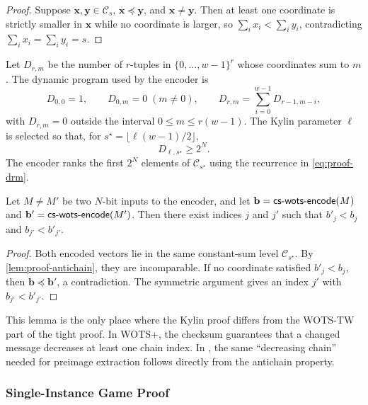 \begin{proof}
Suppose $\mathbf{x},\mathbf{y}\in\mathcal{C}_s$, $\mathbf{x}\preceq
\mathbf{y}$, and $\mathbf{x}\ne\mathbf{y}$.  Then at least one coordinate is
strictly smaller in $\mathbf{x}$ while no coordinate is larger, so
$\sum_i x_i<\sum_i y_i$, contradicting
$\sum_i x_i=\sum_i y_i=s$.
\end{proof}

Let $D_{r,m}$ be the number of $r$-tuples in $\{0,\ldots,w-1\}^r$ whose
coordinates sum to $m$.  The dynamic program used by the encoder is
\begin{equation}
\label{eq:proof-drm}
    D_{0,0}=1,\qquad
    D_{0,m}=0\;(m\ne0),\qquad
    D_{r,m}=\sum_{i=0}^{w-1}D_{r-1,m-i},
\end{equation}
with $D_{r,m}=0$ outside the interval $0\le m\le r(w-1)$.  The Kylin parameter
$\ell$ is selected so that, for
$s^\star=\lfloor\ell(w-1)/2\rfloor$,
\begin{equation}
\label{eq:proof-len-condition}
    D_{\ell,s^\star}\ge 2^N.
\end{equation}
The encoder ranks the first $2^N$ elements of $\mathcal{C}_{s^\star}$ using
the recurrence in \cref{eq:proof-drm}.

\begin{lemma}
\label{lem:proof-cswots-direction}
Let $M\ne M'$ be two $N$-bit inputs to the \WOTSCS encoder, and let
$\mathbf{b}=\mathsf{cs\text{-}wots\text{-}encode}(M)$ and $\mathbf{b}'=\mathsf{cs\text{-}wots\text{-}encode}(M')$.  Then there exist indices
$j$ and $j'$ such that $b'_j<b_j$ and $b_{j'}<b'_{j'}$.
\end{lemma}

\begin{proof}
Both encoded vectors lie in the same constant-sum level
$\mathcal{C}_{s^\star}$.  By \cref{lem:proof-antichain}, they are
incomparable.  If no coordinate satisfied $b'_j<b_j$, then
$\mathbf{b}\preceq\mathbf{b}'$, a contradiction.  The symmetric argument gives
an index $j'$ with $b_{j'}<b'_{j'}$.
\end{proof}

This lemma is the only place where the Kylin proof differs from the WOTS-TW
part of the tight \SPHINCSP proof.  In WOTS+, the checksum guarantees that a
changed message decreases at least one chain index.  In \WOTSCS, the same
``decreasing chain'' needed for preimage extraction follows directly from the
antichain property.

\subsubsection{Single-Instance Game Proof}
\label{sec:proof-cswots-single}

